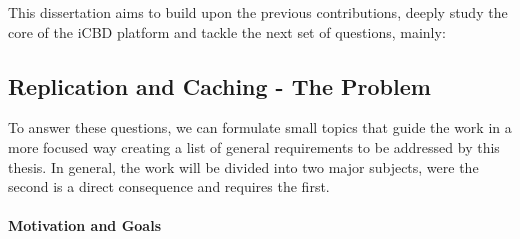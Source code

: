 This dissertation aims to build upon the previous contributions, deeply study the core of the iCBD platform and tackle the next set of questions, mainly:





\subsection{Replication and Caching - The Problem}
\label{sec:replication_cache_theproblem}

To answer these questions, we can formulate small topics that guide the work in a more focused way creating a list of general requirements to be addressed by this thesis.
In general, the work will be divided into two major subjects, were the second is a direct consequence and requires the first.


\paragraph{Motivation and Goals}
\label{par:motivation_goals}

